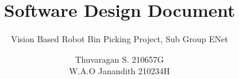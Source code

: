 \documentclass{template}
\begin{document}

\title{\huge{Software Design Document}}
\author{Thuvaragan S. 210657G \\ W.A.O Janandith 210234H}
\subtitle{Vision Based Robot Bin Picking Project, Sub Group ENet}
\beforeabstract
% 
\afterabstract








\footnotesize  %
\printbibliography
\normalsize
\appendix

\end{document}

